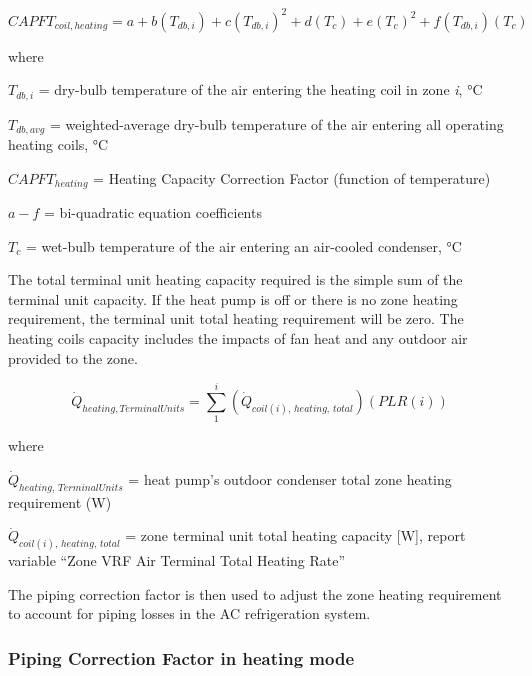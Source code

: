 \begin{equation}
  CAPFT_{coil,heating} = a + b \left( T_{db,i} \right) + c \left( T_{db,i} \right)^2 + d \left( T_c \right) + e \left( T_c \right)^2 + f \left( T_{db,i} \right) \left( T_c \right)
\end{equation}

where

\(T_{db,i}\) = dry-bulb temperature of the air entering the heating coil in zone \emph{i}, °C

\(T_{db,avg}\) = weighted-average dry-bulb temperature of the air entering all operating heating coils, °C

\(CAPFT_{heating}\) = Heating Capacity Correction Factor (function of temperature)

\(a - f\)  = bi-quadratic equation coefficients

\(T_c\)    = wet-bulb temperature of the air entering an air-cooled condenser, °C

The total terminal unit heating capacity required is the simple sum of the terminal unit capacity. If the heat pump is off or there is no zone heating requirement, the terminal unit total heating requirement will be zero. The heating coils capacity includes the impacts of fan heat and any outdoor air provided to the zone.

\begin{equation}
  \dot{Q}_{heating,TerminalUnits} = \sum\limits_1^i \left( \dot{Q}_{coil(i),\,heating,\,total} \right) \left( PLR(i) \right)
\end{equation}

where

\(\dot{Q}_{heating,\,TerminalUnits}\) = heat pump's outdoor condenser total zone heating requirement (W)

\(\dot{Q}_{coil(i),\,heating,\,total}\) = zone terminal unit total heating capacity [W], report variable ``Zone VRF Air Terminal Total Heating Rate''

The piping correction factor is then used to adjust the zone heating requirement to account for piping losses in the AC refrigeration system.

\subsubsection{Piping Correction Factor in heating mode}\label{piping-correction-factor-in-heating-mode}

